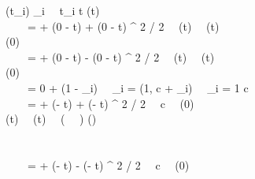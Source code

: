 \begin{figure}[p]
\begin{center}
\begin{sllisting}
  \slind \cavint(t_i) \ge {\cavintmin}_i \, \land \, t_i \le t \limply \cahint(t) \ge \cahintmin\\
  \hspace{0.5em}\text{--}\hspace{0.4em}\Init \, \land \, \Inv \, \land \, \cahzerointmax = \cahintmax + \cavintmin (0 - t) + \caAint (0 - t) ^ 2 / 2 \, \land \, \cahint(t) \le \cahintmax \, \land \, \cavint(t) \ge \cavintmin \\
  \slind \limply \cahint(0) \le \cahzerointmax\\
  \hspace{0.5em}\text{--}\hspace{0.4em}\Init \, \land \, \Inv \, \land \, \cahzerointmin = \cahintmin + \cavintmax (0 - t) - \caAint (0 - t) ^ 2 / 2 \, \land \, \cahint(t) \ge \cahintmin \, \land \, \cavint(t) \le \cavintmax \\
  \slind \limply \cahint(0) \ge \cahzerointmin\\
  \hspace{0.5em}\text{--}\hspace{0.4em}\Init \, \land \, \Inv \, \land \, \cacmin = 0 + (1 - {\caEtaThree}_i) \, \land \, {\caOmegaThree}_i = \min(1, c + {\caEtaThree}_i) \, \land \, {\caOmegaThree}_i = 1 \limply c \ge \cacmin\\
  \hspace{0.5em}\text{--}\hspace{0.4em}\Init \, \land \, \Inv \, \land \, \cahmintmax = \cahintmax + \cavintmax (\catm - t) + \caAint (\catm - t) ^ 2 / 2 \, \land \, c \ge \cacmin \, \land \, \cahint(0) \le \cahzerointmax \, \land \, \\
  \slind \cahint(t) \le \cahintmax \, \land \, \cavint(t) \le \cavintmax \, \land \, (\cacmin {} \, \lor \, \cahzerointmax {}) \limply \cahint(\catm) \le \cahmintmax\\
  \hspace{0.5em}\text{--}\hspace{0.4em}\color{red}{\Init \, \land \, \Inv \, \land \, \cahmintmax = \cahintmax + \cavintmax (\catm - t) \, \land \, c \ge \cacmin \, \land \, \cahint(0) \le \cahzerointmax \, \land \, \cahint(t) \le \cahintmax \, \land \,} \\
  \slind \color{red}{\cavint(t) \le \cavintmax \, \land \, \cacmin > 0 \, \land \, \cahzerointmax < 0 \limply \cahint(\catm) \le \cahmintmax}\\
  \hspace{0.5em}\text{--}\hspace{0.4em}\Init \, \land \, \Inv \, \land \, \cahmintmin = \cahintmin + \cavintmin (\catm - t) - \caAint (\catm - t) ^ 2 / 2 \, \land \, c \ge \cacmin \, \land \, \cahint(0) \ge \cahzerointmin \, \land \, \\

\end{sllisting}
\end{center}
\end{figure}
